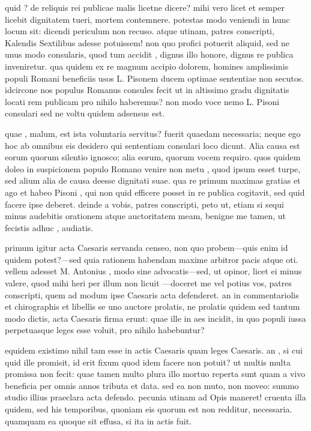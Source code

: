  quid ? de reliquis rei publicae malis licetne dicere? mihi vero licet et semper licebit dignitatem tueri, mortem contemnere. potestas modo veniendi in hunc locum sit: dicendi periculum non recuso. atque utinam, patres conscripti, Kalendis Sextilibus adesse potuissem! non quo profici potuerit aliquid, sed ne unus modo consularis, quod tum accidit , dignus illo honore, dignus re publica inveniretur. qua quidem ex re magnum accipio dolorem, homines amplissimis populi Romani beneficiis usos L. Pisonem ducem optimae sententiae non secutos. idcircone nos populus Romanus consules fecit ut in altissimo gradu dignitatis locati rem publicam pro nihilo haberemus? non modo voce nemo L. Pisoni consulari sed ne voltu quidem adsensus est.

 quae , malum, est ista voluntaria servitus? fuerit quaedam necessaria; neque ego hoc ab omnibus eis desidero qui sententiam consulari loco dicunt. Alia causa est eorum quorum silentio ignosco; alia eorum, quorum vocem requiro. quos quidem doleo in suspicionem populo Romano venire non metu , quod ipsum esset turpe, sed alium alia de causa deesse dignitati suae. qua re primum maximas gratias et ago et habeo Pisoni , qui non quid efficere posset in re publica cogitavit, sed quid facere ipse deberet. deinde a vobis, patres conscripti, peto ut, etiam si sequi minus audebitis orationem atque auctoritatem meam, benigne me tamen, ut fecistis adhuc , audiatis.

 primum igitur acta Caesaris servanda censeo, non quo probem—quis enim id quidem potest?—sed quia rationem habendam maxime arbitror pacis atque oti. vellem adesset M. Antonius , modo sine advocatis—sed, ut opinor, licet ei minus valere, quod mihi heri per illum non licuit —doceret me vel potius vos, patres conscripti, quem ad modum ipse Caesaris acta defenderet. an in commentariolis et chirographis et libellis se uno auctore prolatis, ne prolatis quidem sed tantum modo dictis, acta Caesaris firma erunt: quae ille in aes incidit, in quo populi iussa perpetuasque leges esse voluit, pro nihilo habebuntur?

 equidem existimo nihil tam esse in actis Caesaris quam leges Caesaris. an , si cui quid ille promisit, id erit fixum quod idem facere non potuit? ut multis multa promissa non fecit: quae tamen multo plura illo mortuo reperta sunt quam a vivo beneficia per omnis annos tributa et data. sed ea non muto, non moveo: summo studio illius praeclara acta defendo. pecunia utinam ad Opis maneret! cruenta illa quidem, sed his temporibus, quoniam eis quorum est non redditur, necessaria. quamquam ea quoque sit effusa, si ita in actis fuit.

